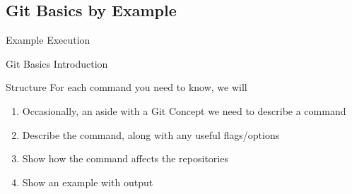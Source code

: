 \documentclass[table,dvipsnames]{beamer}
\begin{document}
\subsection{Git Basics by Example}

\begin{frame}{Example Execution}
\end{frame}


\begin{frame}{Git Basics Introduction}
	\begin{block}{Structure}
		For each command you need to know, we will
		\begin{enumerate}
			\item Occasionally, an aside with a Git Concept we need to describe
				a command
			\item Describe the command, along with any useful flags/options
			\item Show how the command affects the repositories
			\item Show an example with output
		\end{enumerate}
	\end{block}
\end{frame}
\end{document}
